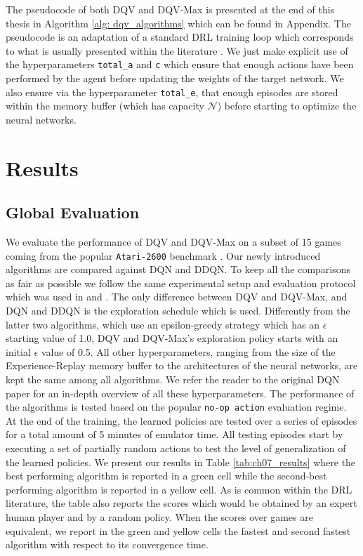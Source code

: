 The pseudocode of both DQV and DQV-Max is presented at the end of this thesis in Algorithm \ref{alg: dqv_algorithms} which can be found in Appendix. The pseudocode is an adaptation of a standard DRL training loop which corresponds to what is usually presented within the literature \cite{mnih2015human}. We just make explicit use of the hyperparameters \texttt{total\_a} and \texttt{c} which ensure that enough actions have been performed by the agent before updating the weights of the target network. We also ensure via the hyperparameter \texttt{total\_e}, that enough episodes are stored within the memory buffer (which has capacity $\mathcal{N}$) before starting to optimize the neural networks. 




\section{Results}
\label{sec:ijcnn_results}

\subsection{Global Evaluation}
\label{sec:global_evaluation}

We evaluate the performance of DQV and DQV-Max on a subset of 15 games coming from the popular \texttt{Atari-2600} benchmark \cite{bellemare2013arcade}. Our newly introduced algorithms are compared against DQN and DDQN. To keep all the comparisons as fair as possible we follow the same experimental setup and evaluation protocol which was used in \cite{mnih2015human} and \cite{van2016deep}. The only difference between DQV and DQV-Max, and DQN and DDQN is the exploration schedule which is used. Differently from the latter two algorithms, which use an epsilon-greedy strategy which has an $\epsilon$ starting value of 1.0, DQV and DQV-Max's exploration policy starts with an initial $\epsilon$ value of 0.5. All other hyperparameters, ranging from the size of the Experience-Replay memory buffer to the architectures of the neural networks, are kept the same among all algorithms. We refer the reader to the original DQN paper \cite{mnih2015human} for an in-depth overview of all these hyperparameters. The performance of the algorithms is tested based on the popular \texttt{no-op action} evaluation regime. At the end of the training, the learned policies are tested over a series of episodes for a total amount of 5 minutes of emulator time. All testing episodes start by executing a set of partially random actions to test the level of generalization of the learned policies. We present our results in Table \ref{tab:ch07_results} where the best performing algorithm is reported in a green cell while the second-best performing algorithm is reported in a yellow cell. As is common within the DRL literature, the table also reports the scores which would be obtained by an expert human player and by a random policy. When the scores over games are equivalent, we report in the green and yellow cells the fastest and second fastest algorithm with respect to its convergence time. 


